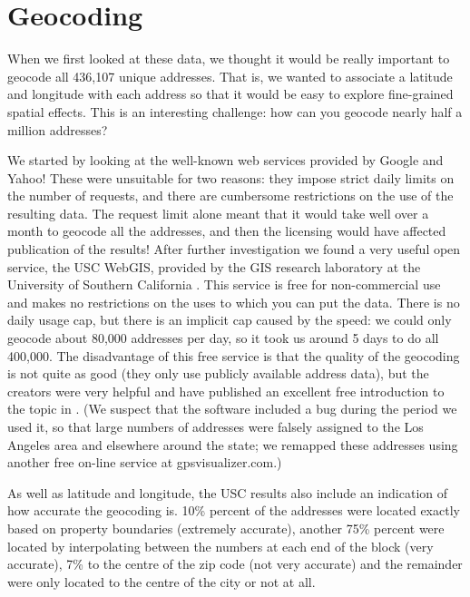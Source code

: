 \documentclass[oneside]{article}
\begin{document}
\section{Geocoding} 

When we first looked at these data, we thought it would be really important to geocode all 436,107 unique addresses.  That is, we wanted to associate a latitude and longitude with each address so that it would be easy to explore fine-grained spatial effects. This is an interesting challenge: how can you geocode nearly half a million addresses? 

We started by looking at the well-known web services provided by Google and Yahoo! These were unsuitable for two reasons: they impose strict daily limits on the number of requests, and there are cumbersome restrictions on the use of the resulting data.  The request limit alone meant that it would take well over a month to geocode all the addresses, and then the licensing would have affected publication of the results! After further investigation we found a very useful open service, the USC WebGIS, provided by the GIS research laboratory at the University of Southern California \citep{uscgis}.  This service is free for non-commercial use and makes no restrictions on the uses to which you can put the data.  There is no daily usage cap, but there is an implicit cap caused by the speed: we could only geocode about 80,000 addresses per day, so it took us around 5 days to do all 400,000.  The disadvantage of this free service is that the quality of the geocoding is not quite as good (they only use publicly available address data), but the creators were very helpful and have published an excellent free introduction to the topic in \citet{goldberg:2008}.  (We suspect that the software included a bug during the period we used it, so that large numbers of addresses were falsely assigned to the Los Angeles area and elsewhere around the state; we remapped these addresses using another free on-line service at gpsvisualizer.com.)

As well as latitude and longitude, the USC results also include an indication of how accurate the geocoding is.  10\%  percent of the addresses were located exactly based on property boundaries (extremely accurate), another 75\% percent were located by interpolating between the numbers at each end of the block (very accurate), 7\% to the centre of the zip code (not very accurate) and the remainder were only located to the centre of the city or not at all.  
\end{document}
